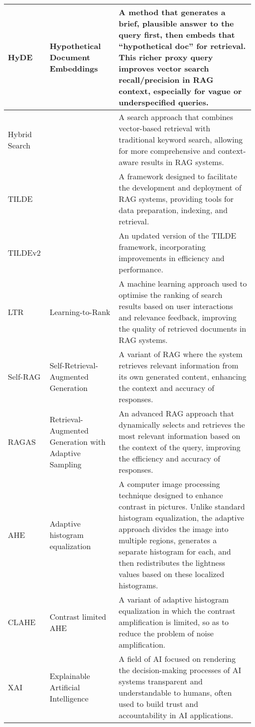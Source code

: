 \begin{tabularx}{\textwidth}{
  >{\raggedright\arraybackslash}p{2.5cm}
  >{\raggedright\arraybackslash}p{4cm}
  >{\noindent\justifying\arraybackslash}X
}
\cmidrule(lr){1-3}
HyDE  & Hypothetical Document Embeddings & A method that generates a brief, plausible answer to the query first, then embeds that ``hypothetical doc'' for retrieval. This richer proxy query improves vector search recall/precision in RAG context, especially for vague or underspecified queries. \\
\cmidrule(lr){1-3}
Hybrid Search &  & A search approach that combines vector-based retrieval with traditional keyword search, allowing for more comprehensive and context-aware results in RAG systems. \\
\cmidrule(lr){1-3}
TILDE &  & A framework designed to facilitate the development and deployment of RAG systems, providing tools for data preparation, indexing, and retrieval. \\
\cmidrule(lr){1-3}
TILDEv2 &  & An updated version of the TILDE framework, incorporating improvements in efficiency and performance. \\
\cmidrule(lr){1-3}
LTR   & Learning-to-Rank & A machine learning approach used to optimise the ranking of search results based on user interactions and relevance feedback, improving the quality of retrieved documents in RAG systems. \\
\cmidrule(lr){1-3}
Self-RAG & Self-Retrieval-Augmented Generation & A variant of RAG where the system retrieves relevant information from its own generated content, enhancing the context and accuracy of responses. \\
\cmidrule(lr){1-3}
RAGAS & Retrieval-Augmented Generation with Adaptive Sampling & An advanced RAG approach that dynamically selects and retrieves the most relevant information based on the context of the query, improving the efficiency and accuracy of responses. \\
\cmidrule(lr){1-3}
AHE & Adaptive histogram equalization & A computer image processing technique designed to enhance contrast in pictures. Unlike standard histogram equalization, the adaptive approach divides the image into multiple regions, generates a separate histogram for each, and then redistributes the lightness values based on these localized histograms. \\
\cmidrule(lr){1-3}
CLAHE & Contrast limited AHE & A variant of adaptive histogram equalization in which the contrast amplification is limited, so as to reduce the problem of noise amplification. \\
\cmidrule(lr){1-3}
XAI & Explainable Artificial Intelligence & A field of AI focused on rendering the decision-making processes of AI systems transparent and understandable to humans, often used to build trust and accountability in AI applications. \\

\end{tabularx}
